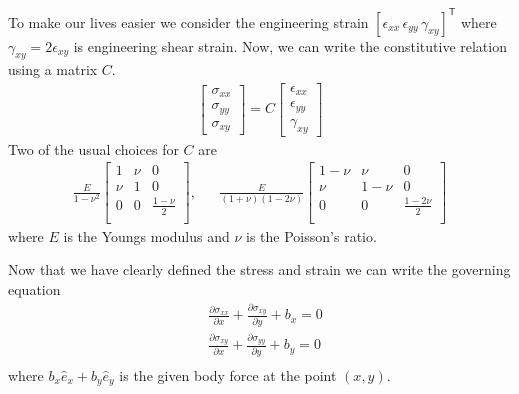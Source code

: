 \documentclass{article}
\newcommand{\pder}[2]{\frac{\partial #1}{\partial #2}}
\begin{document}
To make our lives easier we consider the engineering strain
$[\epsilon_{xx} \, \epsilon_{yy} \, \gamma_{xy}]^\mathsf{T}$
where $\gamma_{xy} = 2 \epsilon_{xy}$ is engineering shear strain.
Now, we can write the constitutive relation using a matrix $C$.
\begin{align*}
  \begin{bmatrix}
    \sigma_{xx} \\ \sigma_{yy} \\ \sigma_{xy}
  \end{bmatrix}
  = C
  \begin{bmatrix}
    \epsilon_{xx} \\ \epsilon_{yy} \\ \gamma_{xy}
  \end{bmatrix}
\end{align*}
Two of the usual choices for $C$ are
\begin{align*}
  \frac{E}{1 - \nu^2}
  \begin{bmatrix}
    1 & \nu & 0 \\
    \nu & 1 & 0 \\
    0 & 0 & \frac{1-\nu}{2} \\
  \end{bmatrix}, &&
  \frac{E}{(1+\nu)(1-2\nu)}
  \begin{bmatrix}
    1-\nu & \nu & 0 \\
    \nu & 1-\nu & 0 \\
    0 & 0 & \frac{1-2\nu}{2} \\
  \end{bmatrix}
\end{align*}
where $E$ is the Youngs modulus
and $\nu$ is the Poisson's ratio.

Now that we have clearly defined
the stress and strain we can write the governing equation
\begin{align*}
  & \pder{\sigma_{xx}}{x} + \pder{\sigma_{xy}}{y} + b_x = 0 \\
  & \pder{\sigma_{xy}}{x} + \pder{\sigma_{yy}}{y} + b_y = 0 \\
\end{align*}
where $b_x \hat{e}_x + b_y \hat{e}_y$ is the given body force
at the point $(x,y)$.
\end{document}
